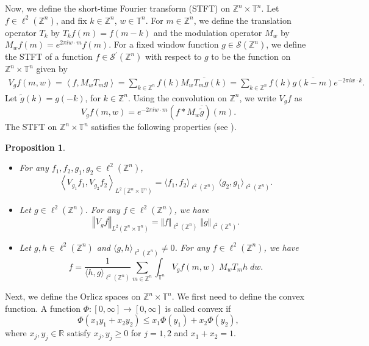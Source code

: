 \documentclass[a4paper,11pt, reqno]{amsart}
\theoremstyle{plain}
\newtheorem{proposition}[theorem]{Proposition}
\theoremstyle{definition}
\theoremstyle{remark}
\def \Z{{\mathbb Z}}
\def \T{{\mathbb T}}
\begin{document}
Now, we define the short-time Fourier transform (STFT) on $\Z^n \times \T^n$. Let $f \in \ell^2(\Z^n)$, and fix $k \in \Z^n$, $w \in \T^n$. For $m \in \Z^n$, we define the translation operator $T_k$ by $T_k f(m)=f(m-k)$ and the modulation operator $M_w$ by $M_w f(m)=e^{2 \pi i w \cdot m} f(m)$. For a fixed window function $g \in \mathcal{S}\left(\mathbb{Z}^{n}\right)$, we define the STFT of a function $f \in \mathcal{S}^{\prime}\left(\mathbb{Z}^{n}\right)$ with respect to $g$ to be the function on $\Z^n \times \T^n$ given by 
\begin{eqnarray*}
V_g f (m, w)= \left\langle f, M_w T_m g \right\rangle 
=  \sum_{k \in \Z^n} f(k) \overline{M_w T_m g (k)} 
=  \sum_{k \in \Z^n} f(k) \overline{g(k-m)} e^{-2 \pi i w \cdot k}.
\end{eqnarray*} 
Let $\tilde{g}(k)=g(-k)$, for $k \in \Z^n$. Using the convolution on $\Z^n$, we write $V_g f$ as
\[ V_g f (m, w)= e^{-2 \pi i w \cdot m} \left( f * M_w \overline{\tilde{g}} \right)(m). \]
The STFT on $\Z^n \times \T^n$ satisfies the following properties (see \cite{das23}). 
\begin{proposition}
\begin{itemize}
\item[(1)] For any $f_1, f_2, g_1, g_2 \in \ell^2(\Z^n)$,
\begin{equation}\label{eq18}
\left\langle V_{g_1} f_1, V_{g_2} f_2 \right\rangle_{L^2(\Z^n \times \T^n)}=\langle f_1, f_2 \rangle_{\ell^2(\Z^n)} \; \langle g_2, g_1 \rangle_{\ell^2(\Z^n)}.
\end{equation}

\item[(2)] Let $g \in \ell^2(\Z^n)$. For any $f \in \ell^2(\Z^n)$, we have
\begin{equation}\label{eq17}
\left\Vert V_g f \right\Vert_{L^2(\Z^n \times \T^n)} = \Vert f \Vert_{\ell^2(\Z^n)} \; \Vert g \Vert_{\ell^2(\Z^n)}.
\end{equation}

\item[(3)] Let $g, h \in \ell^2(\Z^n)$ and $\langle g, h \rangle_{\ell^2(\Z^n)} \neq 0$. For any $f \in \ell^2(\Z^n)$, we have
\[f=\frac{1}{\langle h, g \rangle_{\ell^2(\Z^n)}}
\sum_{m \in \Z^n} \int_{\T^n} V_g f(m,w) \; M_w T_m h  \; dw.\]
\end{itemize}
\end{proposition}

Next, we define the Orlicz spaces on $\Z^n \times \T^n$. We first need to define the convex function. A function $\Phi:[0, \infty] \rightarrow [0, \infty]$ is called convex if
$$ \Phi\left(x_1 y_1+x_2 y_2\right) \leq x_1 \Phi\left(y_1\right)+x_2 \Phi\left(y_2\right), $$
where $x_j, y_j \in \mathbb{R}$ satisfy $x_j, y_j \geq 0$ for $j=1,2$ and $x_1+x_2=1$. 
\end{document}
